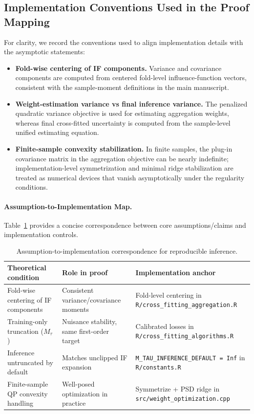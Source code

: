 \documentclass{article}
\begin{document}
\subsection{Implementation Conventions Used in the Proof Mapping}
For clarity, we record the conventions used to align implementation details with the asymptotic statements:
\begin{itemize}
    \item \textbf{Fold-wise centering of IF components.} Variance and covariance components are computed from centered fold-level influence-function vectors, consistent with the sample-moment definitions in the main manuscript.
    \item \textbf{Weight-estimation variance vs final inference variance.} The penalized quadratic variance objective is used for estimating aggregation weights, whereas final cross-fitted uncertainty is computed from the sample-level unified estimating equation.
    \item \textbf{Finite-sample convexity stabilization.} In finite samples, the plug-in covariance matrix in the aggregation objective can be nearly indefinite; implementation-level symmetrization and minimal ridge stabilization are treated as numerical devices that vanish asymptotically under the regularity conditions.
\end{itemize}

\paragraph{Assumption-to-Implementation Map.}
Table~\ref{tab:assumption_code_map} provides a concise correspondence between core assumptions/claims and implementation controls.
\begin{table}[h]
\centering
\small
\begin{tabular}{|l|l|l|}
\hline
\textbf{Theoretical condition} & \textbf{Role in proof} & \textbf{Implementation anchor} \\
\hline
Fold-wise centering of IF components & Consistent variance/covariance moments & Fold-level centering in \texttt{R/cross\_fitting\_aggregation.R} \\
\hline
Training-only truncation ($M_{\tau}$) & Nuisance stability, same first-order target & Calibrated losses in \texttt{R/cross\_fitting\_algorithms.R} \\
\hline
Inference untruncated by default & Matches unclipped IF expansion & \texttt{M\_TAU\_INFERENCE\_DEFAULT = Inf} in \texttt{R/constants.R} \\
\hline
Finite-sample QP convexity handling & Well-posed optimization in practice & Symmetrize + PSD ridge in \texttt{src/weight\_optimization.cpp} \\
\hline
\end{tabular}
\caption{Assumption-to-implementation correspondence for reproducible inference.}
\label{tab:assumption_code_map}
\end{table}
\end{document}

